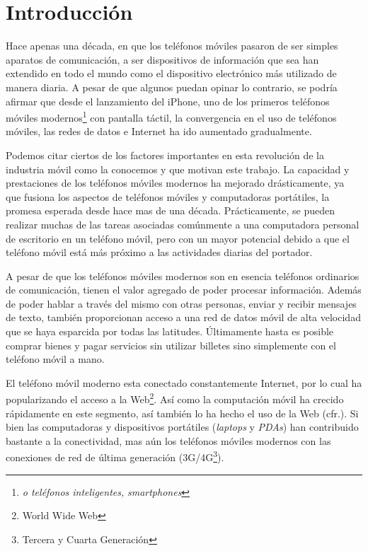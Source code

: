 
\chapter{Introducción}

\label{introduccion}

Hace apenas una década, en que los teléfonos móviles pasaron de ser
simples aparatos de comunicación, a ser dispositivos de información
que sea han extendido en todo el mundo como el dispositivo electrónico
más utilizado de manera diaria. A pesar de que algunos puedan opinar
lo contrario, se podría afirmar que desde el lanzamiento del iPhone,
uno de los primeros teléfonos móviles modernos\footnote{ \textit{\emph{o teléfonos inteligentes, }}\textit{smartphones}}
con pantalla táctil, la convergencia en el uso de teléfonos móviles,
las redes de datos e Internet ha ido aumentado gradualmente\cite{fling2009mobile}.

Podemos citar ciertos de los factores importantes en esta revolución
de la industria móvil como la conocemos y que motivan este trabajo.
La capacidad y prestaciones de los teléfonos móviles modernos ha mejorado
drásticamente, ya que fusiona los aspectos de teléfonos móviles y
computadoras portátiles, la promesa esperada desde hace mas de una
década\cite{Tanenbaum2010}. Prácticamente, se pueden realizar muchas
de las tareas asociadas comúnmente a una computadora personal de escritorio
en un teléfono móvil, pero con un mayor potencial debido a que el
teléfono móvil está más próximo a las actividades diarias del portador.

A pesar de que los teléfonos móviles modernos son en esencia teléfonos
ordinarios de comunicación, tienen el valor agregado de poder procesar
información. Además de poder hablar a través del mismo con otras personas,
enviar y recibir mensajes de texto, también proporcionan acceso a
una red de datos móvil de alta velocidad que se haya esparcida por
todas las latitudes. Últimamente hasta es posible comprar bienes y
pagar servicios sin utilizar billetes sino simplemente con el teléfono
móvil a mano. 

El teléfono móvil moderno esta conectado constantemente Internet,
por lo cual ha popularizando el acceso a la Web\footnote{World Wide Web}.
Así como la computación móvil ha crecido rápidamente en este segmento,
así también lo ha hecho el uso de la Web (cfr.\cite{nyt2008iph}).
Si bien las computadoras y dispositivos portátiles (\emph{laptops}
y \emph{PDAs}) han contribuido bastante a la conectividad, mas aún
los teléfonos móviles modernos con las conexiones de red de última
generación (3G/4G\footnote{Tercera y Cuarta Generación}).

